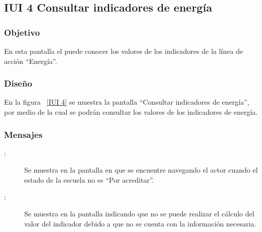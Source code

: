 \subsection{IUI 4 Consultar indicadores de energía}
\subsubsection{Objetivo}
	
	En esta pantalla el  puede conocer los valores de los indicadores
	de la línea de acción ``Energía''.	

\subsubsection{Diseño}

    En la figura ~\ref{IUI 4} se muestra la pantalla ``Consultar indicadores de energía'', por medio de la cual 
    se podrán consultar los valores de los indicadores de energía.


\subsubsection{Mensajes}

	
\begin{description}
	\item[:] Se muestra en la pantalla en que se encuentre navegando el actor cuando el estado de la escuela no es ``Por acreditar''.
	\item[:] Se muestra en la pantalla  indicando que no se puede realizar el cálculo del valor del indicador
				     debido a que no se cuenta con la información necesaria.
\end{description}

